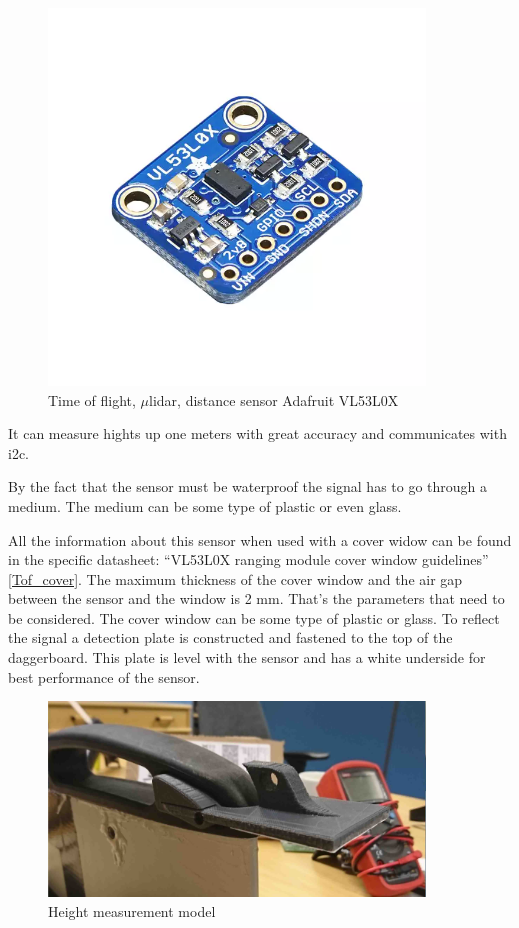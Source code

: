 \begin{figure}[H]
	\centering %
	\includegraphics[width = 10cm]{Figures/Adafruit_height_sensor.png}
	\caption{Time of flight, $\mu$\gls{lidar}, distance sensor Adafruit VL53L0X}
	\label{micro_lidar}
\end{figure}

It can measure hights up one meters with great accuracy and communicates with \gls{i2c}.

By the fact that the sensor must be waterproof the signal has to go through a medium. The medium can be some type of plastic or even glass.   

All the information about this sensor when used with a cover widow can be found in the specific datasheet: “VL53L0X ranging module cover window guidelines” \ref{Tof_cover}. The maximum thickness of the cover window and the air gap between the sensor and the window is 2 mm. That’s the parameters that need to be considered. The cover window can be some type of plastic or glass. To reflect the signal a detection plate is constructed and fastened to the top of the daggerboard. This plate is level with the sensor and has a white underside for best performance of the sensor. 

\begin{figure}[H]
	\centering %
	\includegraphics[width = 10cm]{Figures/height_measure.jpg}
	\caption{Height measurement model}
	\label{height_measure}
\end{figure}


